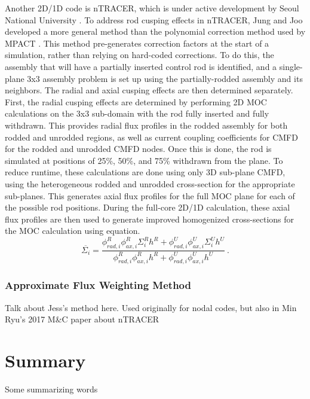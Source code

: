 Another 2D/1D code is nTRACER, which is under active development by Seoul National University \cite{RyuBEAVRSnTRACER2015}.  To address rod cusping effects in nTRACER, Jung and Joo developed a more general method than the polynomial correction method used by MPACT \cite{ICAPPcontrolRodDecuspingNTRACER}.  This method pre-generates correction factors at the start of a simulation, rather than relying on hard-coded corrections.  To do this, the assembly that will have a partially inserted control rod is identified, and a single-plane 3x3 assembly problem is set up using the partially-rodded assembly and its neighbors.  The radial and axial cusping effects are then determined separately.  First, the radial cusping effects are determined by performing 2D MOC calculations on the 3x3 sub-domain with the rod fully inserted and fully withdrawn.  This provides radial flux profiles in the rodded assembly for both rodded and unrodded regions, as well as current coupling coefficients for CMFD for the rodded and unrodded CMFD nodes.  Once this is done, the rod is simulated at positions of 25\%, 50\%, and 75\% withdrawn from the plane.  To reduce runtime, these calculations are done using only 3D sub-plane CMFD, using the heterogeneous rodded and unrodded cross-section for the appropriate sub-planes.  This generates axial flux profiles for the full MOC plane for each of the possible rod positions.  During the full-core 2D/1D calculation, these axial flux profiles are then used to generate improved homogenized cross-sections for the MOC calculation using equation.
\begin{equation}\label{e:nTRACERdecusping}
\overline{\Sigma_i} = \frac{\phi_{rad,i}^R \phi_{ax,i}^R \Sigma_i^R h^R + \phi_{rad,i}^U \phi_{ax,i}^U \Sigma_i^U h^U}{\phi_{rad,i}^R \phi_{ax,i}^R h^R + \phi_{rad,i}^U \phi_{ax,i}^U h^U}\ .
\end{equation}

\subsubsection{Approximate Flux Weighting Method}\label{sss:gehinAFW}

Talk about Jess's method here.  Used originally for nodal codes, but also in Min Ryu's 2017 M\&C paper about nTRACER

\section{Summary}

Some summarizing words
